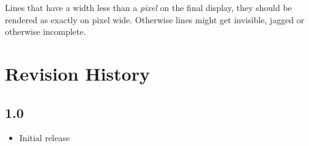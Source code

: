 \documentclass[]{article}
\providecommand{\tightlist}{%
  \setlength{\itemsep}{0pt}\setlength{\parskip}{0pt}}
\begin{document}
Lines that have a width less than a \emph{pixel} on the final display, they should be rendered as exactly on pixel wide. Otherwise lines might get invisible, jagged or otherwise incomplete.

\hypertarget{revision-history}{\section{Revision History}\label{revision-history}}

\hypertarget{10}{%
\subsection{1.0}\label{10}}

\begin{itemize}
\tightlist
\item Initial release
\end{itemize}
\end{document}
